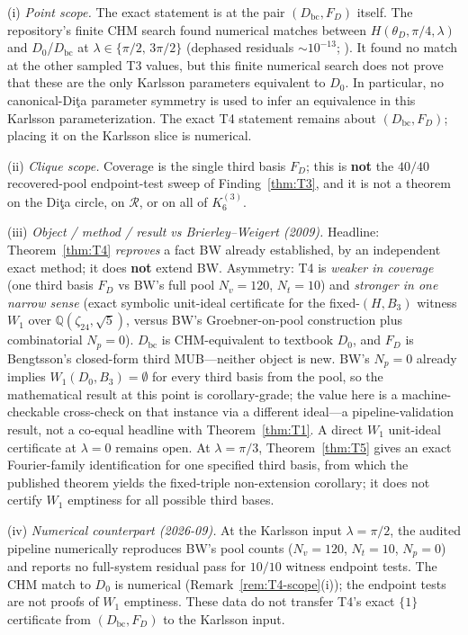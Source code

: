\begin{remark}
\label{rem:T4-scope}
(i) \emph{Point scope.} The exact statement is at the pair $(D_{\mathrm{bc}},F_D)$ itself. The repository's finite CHM search found numerical matches between $H(\theta_D,\pi/4,\lambda)$ and $D_0$/$D_{\mathrm{bc}}$ at $\lambda\in\{\pi/2,\,3\pi/2\}$ (dephased residuals $\sim10^{-13}$; ). It found no match at the other sampled T3 values, but this finite numerical search does not prove that these are the only Karlsson parameters equivalent to $D_0$. In particular, no canonical-Di\c{t}a parameter symmetry is used to infer an equivalence in this Karlsson parameterization. The exact T4 statement remains about $(D_{\mathrm{bc}},F_D)$; placing it on the Karlsson slice is numerical.

(ii) \emph{Clique scope.} Coverage is the single third basis $F_D$; this is \textbf{not} the $40/40$ recovered-pool endpoint-test sweep of Finding~\ref{thm:T3}, and it is not a theorem on the Di\c{t}a circle, on $\mathcal{R}$, or on all of $K_6^{(3)}$.

(iii) \emph{Object / method / result vs Brierley--Weigert (2009).} Headline: Theorem~\ref{thm:T4} \emph{reproves} a fact BW already established, by an independent exact method; it does \textbf{not} extend BW. Asymmetry: T4 is \emph{weaker in coverage} (one third basis $F_D$ vs BW's full pool $N_v{=}120$, $N_t{=}10$) and \emph{stronger in one narrow sense} (exact symbolic unit-ideal certificate for the fixed-$(H,B_3)$ witness $W_1$ over $\mathbb{Q}(\zeta_{24},\sqrt5)$, versus BW's Groebner-on-pool construction plus combinatorial $N_p{=}0$). $D_{\mathrm{bc}}$ is CHM-equivalent to textbook $D_0$, and $F_D$ is Bengtsson's closed-form third MUB---neither object is new. BW's $N_p{=}0$ already implies $W_1(D_0,B_3)=\emptyset$ for every third basis from the pool, so the mathematical result at this point is corollary-grade; the value here is a machine-checkable cross-check on that instance via a different ideal---a pipeline-validation result, not a co-equal headline with Theorem~\ref{thm:T1}. A direct $W_1$ unit-ideal certificate at $\lambda=0$ remains open. At $\lambda=\pi/3$, Theorem~\ref{thm:T5} gives an exact Fourier-family identification for one specified third basis, from which the published theorem yields the fixed-triple non-extension corollary; it does not certify $W_1$ emptiness for all possible third bases.

(iv) \emph{Numerical counterpart (2026-09).} At the Karlsson input $\lambda=\pi/2$, the audited pipeline numerically reproduces BW's pool counts ($N_v{=}120$, $N_t{=}10$, $N_p{=}0$) and reports no full-system residual pass for $10/10$ witness endpoint tests. The CHM match to $D_0$ is numerical (Remark~\ref{rem:T4-scope}(i)); the endpoint tests are not proofs of $W_1$ emptiness. These data do not transfer T4's exact $\{1\}$ certificate from $(D_{\mathrm{bc}},F_D)$ to the Karlsson input.
\end{remark}

